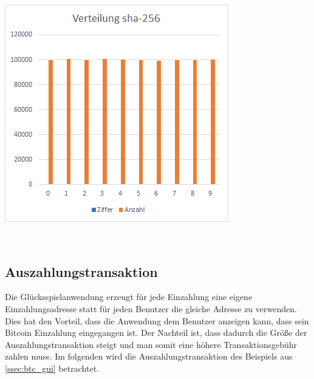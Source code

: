 \begin{minipage}{0.5\textwidth}
\includegraphics[width=\textwidth]{Figures/verteilung_sha256}
\centering
\decoRule
{}
\label{fig:verteilung_sha256}
\end{minipage}

\\
\subsection{Auszahlungstransaktion} \label{sssec:Auszahlungstransaktion}
Die Glücksspielanwendung erzeugt für jede Einzahlung eine eigene Einzahlungsadresse statt für jeden Benutzer die gleiche Adresse zu verwenden. Dies hat den Vorteil, dass die Anwendung dem Benutzer anzeigen kann, dass sein Bitcoin Einzahlung eingegangen ist. Der Nachteil ist, dass dadurch die Größe der Auszahlungstransaktion steigt und man somit eine höhere Transaktionsgebühr zahlen muss. Im folgenden wird die Auszahlungstransaktion des Beispiels aus \ref{ssec:btc_gui} betrachtet.

